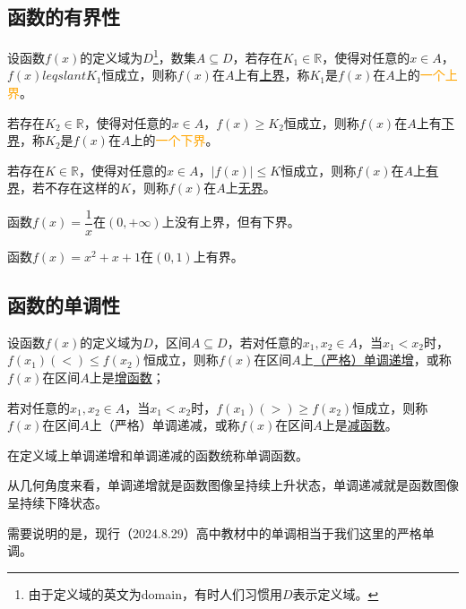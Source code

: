 \documentclass[lang=cn,math=cm,chinesefont=nofont,11pt,scheme=chinese,onecol]{elegantbook}
\begin{document}
\subsection{函数的有界性}

\begin{definition}
  设函数$f(x)$的定义域为$D$\footnote{由于定义域的英文为domain，有时人们习惯用$D$表示定义域。}，数集$A\subseteq D$，若存在$K_1\in\mathbb{R}$，使得对任意的$x\in A$，$f(x)leqslant K_1$恒成立，则称$f(x)$在$A$上有\underline{上界}，称$K_1$是$f(x)$在$A$上的\textcolor{orange}{一个上界}。

  若存在$K_2\in\mathbb{R}$，使得对任意的$x\in A$，$f(x)\geqslant K_2$恒成立，则称$f(x)$在$A$上有\underline{下界}，称$K_2$是$f(x)$在$A$上的\textcolor{orange}{一个下界}。

  若存在$K\in\mathbb{R}$，使得对任意的$x\in A$，$\left|f(x)\right|\leqslant K$恒成立，则称$f(x)$在$A$上\underline{有界}，若不存在这样的$K$，则称$f(x)$在$A$上\underline{无界}。
\end{definition}

\begin{example}
  函数$f(x)=\dfrac1x$在$(0,+\infty)$上没有上界，但有下界。
\end{example}

\begin{example}
  函数$f(x)=x^2+x+1$在$(0,1)$上有界。
\end{example}

\subsection{函数的单调性}

\begin{definition}
  设函数$f(x)$的定义域为$D$，区间$A\subseteq D$，若对任意的$x_1,x_2\in A$，当$x_1<x_2$时，$f(x_1)(<)\leqslant f(x_2)$恒成立，则称$f(x)$在区间$A$上\underline{（严格）单调递增}，或称$f(x)$在区间$A$上是\underline{增函数}；

  若对任意的$x_1,x_2\in A$，当$x_1<x_2$时，$f(x_1)(>)\geqslant f(x_2)$恒成立，则称$f(x)$在区间$A$上（严格）单调递减，或称$f(x)$在区间$A$上是\underline{减函数}。

  在定义域上单调递增和单调递减的函数统称单调函数。
\end{definition}

从几何角度来看，单调递增就是函数图像呈持续上升状态，单调递减就是函数图像呈持续下降状态。

需要说明的是，现行（2024.8.29）高中教材中的单调相当于我们这里的严格单调。
\end{document}
